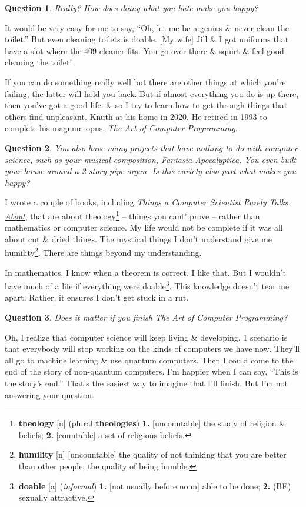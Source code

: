 \documentclass[oneside]{book}
\numberwithin{equation}{section}
\newtheorem{question}{Question}[chapter]
\begin{document}
\begin{question}
	Really? How does doing what you hate make you happy?
\end{question}
It would be very easy for me to say, ``Oh, let me be a genius \& never clean the toilet.'' But even cleaning toilets is doable. [My wife] Jill \& I got uniforms that have a slot where the 409 cleaner fits. You go over there \& squirt \& feel good cleaning the toilet!

 If you can do something really well but there are other things at which you're failing, the latter will hold you back. But if almost everything you do is up there, then you've got a good life. \& so I try to learn how to get through things that others find unpleasant. \textsf{Knuth at his home in 2020. He retired in 1993 to complete his magnum opus, \textit{The Art of Computer Programming}.}

\begin{question}
	You also have many projects that have nothing to do with computer science, such as your musical composition, \href{https://www-cs-faculty.stanford.edu/~knuth/fant.html}{\textit{Fantasia Apocalyptica}}. You even built your house around a 2-story pipe organ. Is this variety also part what makes you happy?
\end{question}
I wrote a couple of books, including \href{https://www-cs-faculty.stanford.edu/~knuth/things.html}{\textit{Things a Computer Scientist Rarely Talks About}}, that are about theology\footnote{\textbf{theology} [n] (plural \textbf{theologies}) \textbf{1.} [uncountable] the study of religion \& beliefs; \textbf{2.} [countable] a set of religious beliefs.} -- things you cant' prove -- rather than mathematics or computer science. My life would not be complete if it was all about cut \& dried things. The mystical things I don't understand give me humility\footnote{\textbf{humility} [n] [uncountable] the quality of not thinking that you are better than other people; the quality of being humble.}. There are things beyond my understanding.

In mathematics, I know when a theorem is correct. I like that. But I wouldn't have much of a life if everything were doable\footnote{\textbf{doable} [a] (\textit{informal}) \textbf{1.} [not usually before noun] able to be done; \textbf{2.} (BE) sexually attractive.}. This knowledge doesn't tear me apart. Rather, it ensures I don't get stuck in a rut.

\begin{question}
	Does it matter if you finish \emph{The Art of Computer Programming?}
\end{question}
Oh, I realize that computer science will keep living \& developing. 1 scenario is that everybody will stop working on the kinds of computers we have now. They'll all go to machine learning \& use quantum computers. Then I could come to the end of the story of non-quantum computers. I'm happier when I can say, ``This is the story's end.'' That's the easiest way to imagine that I'll finish. But I'm not answering your question.
\end{document}
